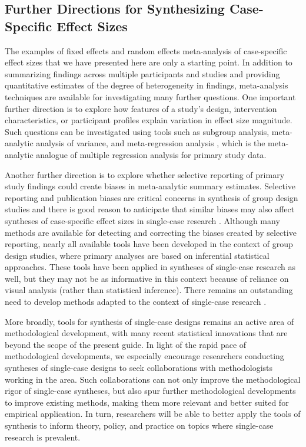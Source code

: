 \documentclass[
]{book}
\begin{document}
\hypertarget{further-directions-for-synthesizing-case-specific-effect-sizes}{%
\subsection{Further Directions for Synthesizing Case-Specific Effect Sizes}\label{further-directions-for-synthesizing-case-specific-effect-sizes}}

The examples of fixed effects and random effects meta-analysis of case-specific effect sizes that we have presented here are only a starting point. In addition to summarizing findings across multiple participants and studies and providing quantitative estimates of the degree of heterogeneity in findings, meta-analysis techniques are available for investigating many further questions. One important further direction is to explore how features of a study's design, intervention characteristics, or participant profiles explain variation in effect size magnitude. Such questions can be investigated using tools such as subgroup analysis, meta-analytic analysis of variance, and meta-regression analysis \citetext{\citealp[Chapters 19-21]{borenstein2021introduction}; \citealp{konstantopoulos2019statistically}; \citealp{Moeyaert_Yang_Xue_2023}}, which is the meta-analytic analogue of multiple regression analysis for primary study data.

Another further direction is to explore whether selective reporting of primary study findings could create biases in meta-analytic summary estimates. Selective reporting and publication biases are critical concerns in synthesis of group design studies \citep{rothstein2005publication} and there is good reason to anticipate that similar biases may also affect syntheses of case-specific effect sizes in single-case research \citep{Dowdy2020, Gage2017, Sham_Smith_2014, Shadish2016}. Although many methods are available for detecting and correcting the biases created by selective reporting, nearly all available tools have been developed in the context of group design studies, where primary analyses are based on inferential statistical approaches. These tools have been applied in syntheses of single-case research as well, but they may not be as informative in this context because of reliance on visual analysis (rather than statistical inference). There remains an outstanding need to develop methods adapted to the context of single-case research \citep{Dowdy2022, pustejovsky2017Research}.

More broadly, tools for synthesis of single-case designs remains an active area of methodological development, with many recent statistical innovations that are beyond the scope of the present guide. In light of the rapid pace of methodological developments, we especially encourage researchers conducting syntheses of single-case designs to seek collaborations with methodologists working in the area. Such collaborations can not only improve the methodological rigor of single-case syntheses, but also spur further methodological developments to improve existing methods, making them more relevant and better suited for empirical application. In turn, researchers will be able to better apply the tools of synthesis to inform theory, policy, and practice on topics where single-case research is prevalent.

  
\end{document}
